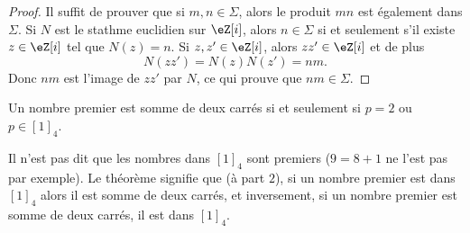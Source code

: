 \begin{proof}
    Il suffit de prouver que si \( m,n\in \Sigma\), alors le produit \( mn\) est également dans \( \Sigma\). Si \( N\) est le stathme euclidien sur \( \eZ[i]\), alors  \( n\in \Sigma\) si et seulement s'il existe \( z\in \eZ[i]\) tel que \( N(z)=n\). Si \( z,z'\in \eZ[i]\), alors \( zz'\in \eZ[i]\) et de plus
    \begin{equation}
        N(zz')=N(z)N(z')=nm.
    \end{equation}
    Donc \( nm\) est l'image de \( zz'\) par \( N\), ce qui prouve que \( nm\in \Sigma\).
\end{proof}

\begin{theorem}   \label{ThospaAEI}
    Un nombre premier est somme de deux carrés si et seulement si \( p=2\) ou \( p\in[1]_4\).
\end{theorem}

\begin{remark}
    Il n'est pas dit que les nombres dans \( [1]_4\) sont premiers (\( 9=8+1\) ne l'est pas par exemple). Le théorème signifie que (à part \( 2\)), si un nombre premier est dans \( [1]_4\) alors il est somme de deux carrés, et inversement, si un nombre premier est somme de deux carrés, il est dans \( [1]_4\).
\end{remark}

